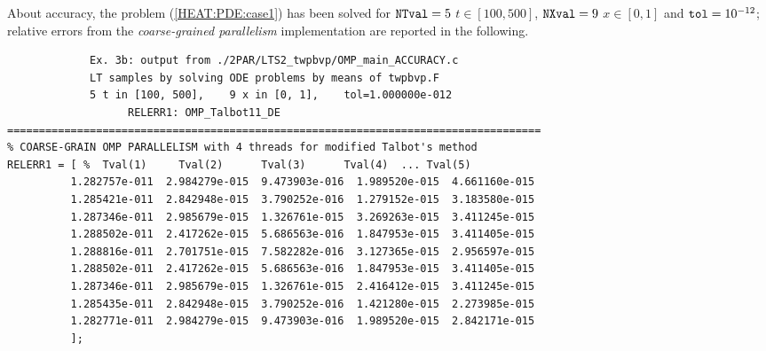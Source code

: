 \documentclass[a4paper,10pt]{report}%
\begin{document}
About accuracy, the problem (\ref{HEAT:PDE:case1}) has been solved for ${\tt NTval}=5$ $t\in[100, 500]$,
${\tt NXval}=9$ $x\in[0,1]$ and ${\tt tol}=10^{-12}$; relative errors from the {\em coarse-grained parallelism}
implementation are reported in the following.
\begin{lstlisting}
             Ex. 3b: output from ./2PAR/LTS2_twpbvp/OMP_main_ACCURACY.c
             LT samples by solving ODE problems by means of twpbvp.F
             5 t in [100, 500],    9 x in [0, 1],    tol=1.000000e-012
                   RELERR1: OMP_Talbot11_DE
====================================================================================
% COARSE-GRAIN OMP PARALLELISM with 4 threads for modified Talbot's method
RELERR1 = [ %  Tval(1)     Tval(2)      Tval(3)      Tval(4)  ... Tval(5)
          1.282757e-011  2.984279e-015  9.473903e-016  1.989520e-015  4.661160e-015
          1.285421e-011  2.842948e-015  3.790252e-016  1.279152e-015  3.183580e-015
          1.287346e-011  2.985679e-015  1.326761e-015  3.269263e-015  3.411245e-015
          1.288502e-011  2.417262e-015  5.686563e-016  1.847953e-015  3.411405e-015
          1.288816e-011  2.701751e-015  7.582282e-016  3.127365e-015  2.956597e-015
          1.288502e-011  2.417262e-015  5.686563e-016  1.847953e-015  3.411405e-015
          1.287346e-011  2.985679e-015  1.326761e-015  2.416412e-015  3.411245e-015
          1.285435e-011  2.842948e-015  3.790252e-016  1.421280e-015  2.273985e-015
          1.282771e-011  2.984279e-015  9.473903e-016  1.989520e-015  2.842171e-015
          ];
\end{lstlisting}
\end{document}
